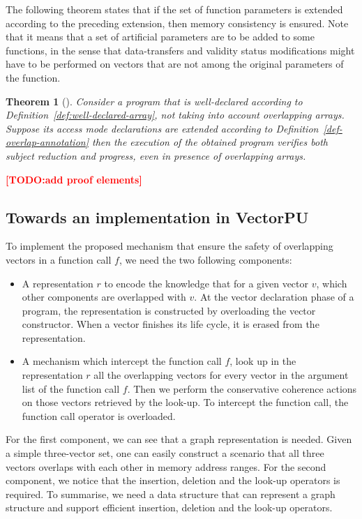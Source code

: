 \documentclass[preprint,12pt]{elsarticle}
\newcommand{\TODO}[1]{\textcolor{red}{\textbf{[TODO:#1]}}}
\newtheorem{Theorem}{Theorem}
\begin{document}
The following theorem states that if the set of function parameters is extended according to the preceding extension, then memory consistency is ensured. Note that it means that a set of artificial parameters are to be added to some functions, in the sense that  data-transfers and validity status modifications might have to be performed on vectors that are not among the original parameters of the function.

\begin{Theorem}[]
Consider a program that is well-declared according to Definition~\ref{def:well-declared-array}, not taking into account  overlapping arrays. Suppose its access mode declarations are extended according to Definition~\ref{def-overlap-annotation} then the execution of the obtained program verifies both subject reduction and progress, even in presence of overlapping arrays.
\end{Theorem}

\TODO{add proof elements}

\subsection{Towards an implementation in VectorPU}


To implement the proposed mechanism that ensure the safety of overlapping vectors
in a function call $f$, we need the two following components:
\begin{itemize}
    \item A representation $r$ to encode the knowledge that for a given vector $v$,
          which other components are overlapped with $v$.
          At the vector declaration phase of a program,
          the representation is constructed by overloading the vector constructor.
          When a vector finishes its life cycle,
          it is erased from the representation.
    \item A mechanism which intercept the function call $f$,
          look up in the representation $r$ all the overlapping vectors for every vector in the argument list
          of the function call $f$. Then we perform the conservative coherence actions on those vectors retrieved by the look-up.
          To intercept the function call, the function call operator is overloaded.
\end{itemize}

For the first component, we can see that a graph representation is needed.
Given a simple three-vector set, one can easily construct a scenario
that all three vectors overlaps with each other in memory address ranges.
For the second component, we notice that the insertion, deletion and the look-up operators is required.
To summarise, we need a data structure that can represent a graph structure and support efficient insertion, deletion
and the look-up operators.
\end{document}
